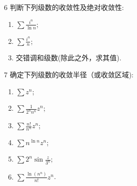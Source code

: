\documentclass[11pt]{article}
\begin{document}
\vspace{0.5cm}

\begin{hwproblem}{6}
  判断下列级数的收敛性及绝对收敛性:
  \begin{enumerate}
    \item $\sum \frac{i^n}{\ln n}$;
    \item $\sum \frac{i^n}{n}$;
    \item  交错调和级数(除此之外，求其值).
  \end{enumerate}
\end{hwproblem}

\vspace{0.5cm}


\begin{hwproblem}{7}
  确定下列级数的收敛半径（或收敛区域):
  \begin{enumerate}
    \item $\sum z^n$;
    \item $\sum \frac{1}{2^n n^n} z^n$;
    \item $\sum \frac{n !}{n^n} z^n$;
    \item $\sum n^{\ln{n}} z^n$;
    \item $\sum 2^n \sin \frac{z}{3^n}$;
    \item $\sum \frac{\ln \left(n^n\right)}{n !} z^n$.
  \end{enumerate}
\end{hwproblem}

\vspace{0.5cm}


\vspace{0.5cm}


\end{document}
